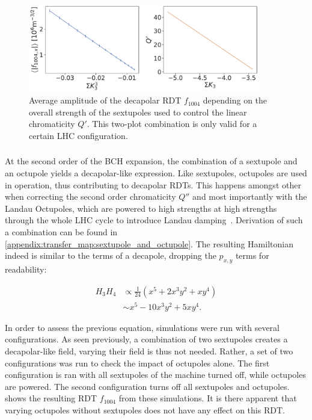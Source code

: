 \begin{figure}[!htb]
    \centering
    \includegraphics[width=0.9\textwidth]{./images/f1004/avg_f1004_k3.pdf}
    \caption{Average amplitude of the decapolar RDT $f_{1004}$ depending on the overall strength
    of the sextupoles used to control the linear chromaticity $Q'$. This two-plot combination is
    only valid for a certain LHC configuration.}
    \label{fig:decapoles:sextupoles_k3_f1004}
\end{figure}




\subsubsection{}


At the second order of the BCH expansion, the combination of a sextupole and an octupole yields a
decapolar-like expression.
Like sextupoles, octupoles are used in operation, thus contributing to decapolar RDTs. This
happens amongst other when correcting the second order chromaticity $Q''$ and most importantly with
the Landau Octupoles, which are powered to high strengths at high strengths through the whole LHC
cycle to introduce Landau damping~\cite{gareyte_landau_1997}.
Derivation of such a combination can be found in
\cref{appendix:transfer_map:sextupole_and_octupole}. The resulting Hamiltonian indeed is similar to
the terms of a decapole, dropping the $p_{x,y}$ terms for readability:

\begin{equation}
    \begin{aligned}
         H_3 H_4 &\propto \frac{1}{24} \left(x^5 + 2x^3y^2 + xy^4 \right)\\
                   &\sim    x^5 - 10x^3y^2 + 5xy^4.
    \end{aligned}
    \label{eq:decapoles:sextupole_octupole_b5}
\end{equation}

In order to assess the previous equation, simulations were run with several configurations.
As seen previously, a combination of two sextupoles creates a decapolar-like field, varying their 
field is thus not needed. Rather, a set of two configurations was run to check the impact of 
octupoles alone. The first configuration is ran with all sextupoles of the machine
turned off, while octupoles are powered. The second configuration turns off all sextupoles and
octupoles.  shows the resulting RDT $f_{1004}$
from these simulations. It is there apparent that varying octupoles without sextupoles does not have 
any effect on this RDT.

